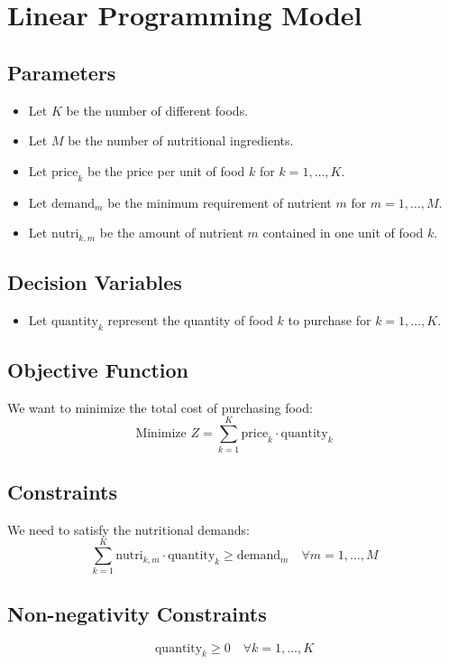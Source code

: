 \documentclass{article}
\begin{document}
\section*{Linear Programming Model}

\subsection*{Parameters}
\begin{itemize}
    \item Let \( K \) be the number of different foods.
    \item Let \( M \) be the number of nutritional ingredients.
    \item Let \( \text{price}_k \) be the price per unit of food \( k \) for \( k = 1, \ldots, K \).
    \item Let \( \text{demand}_m \) be the minimum requirement of nutrient \( m \) for \( m = 1, \ldots, M \).
    \item Let \( \text{nutri}_{k,m} \) be the amount of nutrient \( m \) contained in one unit of food \( k \).
\end{itemize}

\subsection*{Decision Variables}
\begin{itemize}
    \item Let \( \text{quantity}_k \) represent the quantity of food \( k \) to purchase for \( k = 1, \ldots, K \).
\end{itemize}

\subsection*{Objective Function}
We want to minimize the total cost of purchasing food:
\[
\text{Minimize } Z = \sum_{k=1}^{K} \text{price}_k \cdot \text{quantity}_k
\]

\subsection*{Constraints}
We need to satisfy the nutritional demands:
\[
\sum_{k=1}^{K} \text{nutri}_{k,m} \cdot \text{quantity}_k \geq \text{demand}_m \quad \forall m = 1, \ldots, M
\]

\subsection*{Non-negativity Constraints}
\[
\text{quantity}_k \geq 0 \quad \forall k = 1, \ldots, K
\]
\end{document}
